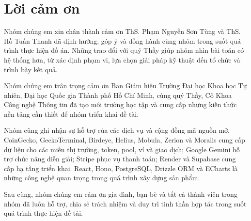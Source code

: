 \chapter*{Lời cảm ơn}
\label{thanks}

Nhóm chúng em xin chân thành cảm ơn ThS. Phạm Nguyễn Sơn Tùng và ThS. Hồ Tuấn Thanh đã định hướng, góp ý và đồng hành cùng nhóm trong suốt quá trình thực hiện đồ án. Những trao đổi với quý Thầy giúp nhóm nhìn bài toán có hệ thống hơn, từ xác định phạm vi, lựa chọn giải pháp kỹ thuật đến tổ chức và trình bày kết quả.

Nhóm chúng em trân trọng cảm ơn Ban Giám hiệu Trường Đại học Khoa học Tự nhiên, Đại học Quốc gia Thành phố Hồ Chí Minh, cùng quý Thầy, Cô Khoa Công nghệ Thông tin đã tạo môi trường học tập và cung cấp những kiến thức nền tảng cần thiết để nhóm triển khai đề tài.

Nhóm cũng ghi nhận sự hỗ trợ của các dịch vụ và cộng đồng mã nguồn mở. CoinGecko, GeckoTerminal, Birdeye, Helius, Mobula, Zerion và Moralis cung cấp dữ liệu cho các miền thị trường, token, pool, ví và giao dịch; Google Gemini hỗ trợ chức năng diễn giải; Stripe phục vụ thanh toán; Render và Supabase cung cấp hạ tầng triển khai. React, Hono, PostgreSQL, Drizzle ORM và ECharts là những công nghệ quan trọng trong quá trình xây dựng sản phẩm.

Sau cùng, nhóm chúng em cảm ơn gia đình, bạn bè và tất cả thành viên trong nhóm đã luôn hỗ trợ, chia sẻ trách nhiệm và duy trì tinh thần hợp tác trong suốt quá trình thực hiện đề tài.
